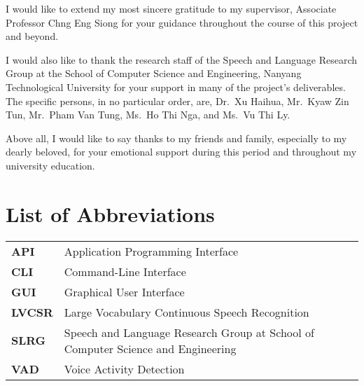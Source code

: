I would like to extend my most sincere gratitude to my supervisor,
Associate Professor Chng Eng Siong for your guidance throughout
the course of this project and beyond.

I would also like to thank the research staff of the Speech
and Language Research Group at the School of Computer Science and Engineering,
Nanyang Technological University for your support in many of the project's
deliverables. The specific persons, in no particular order, are, Dr.\ Xu Haihua,
Mr.\ Kyaw Zin Tun, Mr.\ Pham Van Tung, Ms.\ Ho Thi Nga, and Ms.\ Vu Thi Ly.

Above all, I would like to say thanks to my friends and family, especially to my
dearly beloved, for your emotional support during this period and throughout my
university education.
\newpage

\tableofcontents
\newpage

\listoffigures
\newpage

\listoftables
\newpage

\chapter*{List of Abbreviations}
\begin{tabu}{lX}
    \textbf{API} & Application Programming Interface \\
    \textbf{CLI} & Command-Line Interface \\
    \textbf{GUI} & Graphical User Interface \\
    \textbf{LVCSR} & Large Vocabulary Continuous Speech Recognition \\
    \textbf{SLRG} & Speech and Language Research Group at School of Computer
    Science and Engineering \\
    \textbf{VAD} & Voice Activity Detection
\end{tabu}
\newpage
